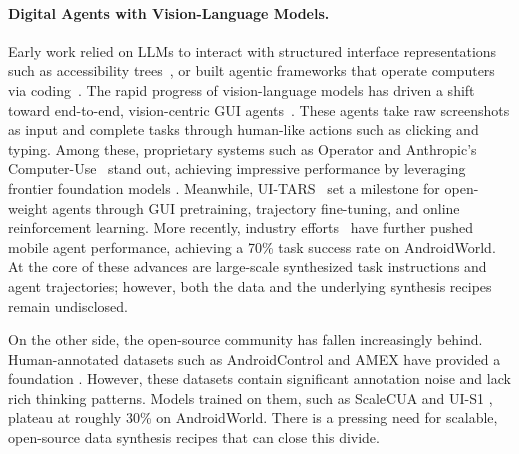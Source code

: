 \documentclass{article} %
\begin{document}
\paragraph{Digital Agents with Vision-Language Models.}
Early work relied on LLMs to interact with structured interface representations such as accessibility trees~\citep{deng2023mind2web, gur2023real}, or built agentic frameworks that operate computers via coding~\citep{wu2024copilot, sun2024survey}.
The rapid progress of vision-language models has driven a shift toward end-to-end, vision-centric GUI agents~\citep{cheng2024seeclick, gou2024navigating, wu2024atlas, wu2025gui}. 
These agents take raw screenshots as input and complete tasks through human-like actions such as clicking and typing.
Among these, proprietary systems such as Operator \citep{openai2025operator} and Anthropic's Computer-Use~\citep{anthropic2024computeruse} stand out, achieving impressive performance by leveraging frontier foundation models \citep{yang2026symphony}.
Meanwhile, UI-TARS~\citep{qin2025ui,wang2025ui} set a milestone for open-weight agents through GUI pretraining, trajectory fine-tuning, and online reinforcement learning.
More recently, industry efforts~\citep{yan2025step,zhou2025mai,gao2026ui,xu2026mobile} have further pushed mobile agent performance, achieving a 70\% task success rate on AndroidWorld.
At the core of these advances are large-scale synthesized task instructions and agent trajectories; however, both the data and the underlying synthesis recipes remain undisclosed.

On the other side, the open-source community has fallen increasingly behind.
Human-annotated datasets such as AndroidControl \citep{li2024effects} and AMEX \citep{chai2025amex} have provided a foundation \citep{rawles2023androidinthewild, lu2025guiodyssey, yang2026gui,sun2025sentinel}.
However, these datasets contain significant annotation noise and lack rich thinking patterns.
Models trained on them, such as ScaleCUA \citep{liu2025scalecua} and UI-S1 \citep{lu2025ui}, plateau at roughly 30\% on AndroidWorld.
There is a pressing need for scalable, open-source data synthesis recipes that can close this divide.
\end{document}
